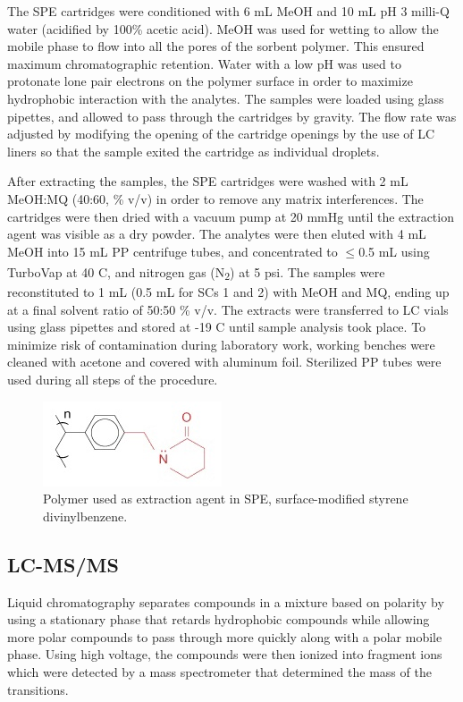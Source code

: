 The SPE cartridges were conditioned with 6 mL \acrshort{MeOH} and 10 mL pH 3 milli-Q water (acidified by 100\% acetic acid). MeOH was used for wetting to allow the mobile phase to flow into all the pores of the sorbent polymer. This ensured maximum chromatographic retention. Water with a low pH was used to protonate lone pair electrons on the polymer surface in order to maximize hydrophobic interaction with the analytes. The samples were loaded using glass pipettes, and allowed to pass through the cartridges by gravity. The flow rate was adjusted by modifying the opening of the cartridge openings by the use of LC liners so that the sample exited the cartridge as individual droplets.

After extracting the samples, the SPE cartridges were washed with 2 mL MeOH:\acrshort{MQ} (40:60, \% v/v) in order to remove any matrix interferences. The cartridges were then dried with a vacuum pump at 20 mmHg until the extraction agent was visible as a dry powder. The analytes were then eluted with 4 mL MeOH into 15 mL PP centrifuge tubes, and concentrated to $\le$0.5 mL using TurboVap\textsuperscript{\textregistered} at 40 \textdegree C, and nitrogen gas (N\textsubscript{2}) at 5 psi. The samples were reconstituted to 1 mL (0.5 mL for SCs 1 and 2) with MeOH and MQ, ending up at a final solvent ratio of 50:50 \% v/v. The extracts were transferred to LC vials using glass pipettes and stored at -19 \textdegree C until sample analysis took place. To minimize risk of contamination during laboratory work, working benches were cleaned with acetone and covered with aluminum foil. Sterilized PP tubes were used during all steps of the procedure.

\begin{figure}
    \centering
    \includegraphics{Bilder/SPE_LCMS/mg_spe_strata-x.jpg}
    \caption{Polymer used as extraction agent in SPE, surface-modified styrene divinylbenzene.}
    \label{fig:StatPhase}
\end{figure}

\subsection{LC-MS/MS \label{sec:LCMS}}
Liquid chromatography separates compounds in a mixture based on polarity by using a stationary phase that retards hydrophobic compounds while allowing more polar compounds to pass through more quickly along with a polar mobile phase. Using high voltage, the compounds were then ionized into fragment ions which were detected by a mass spectrometer that determined the mass of the transitions. 

